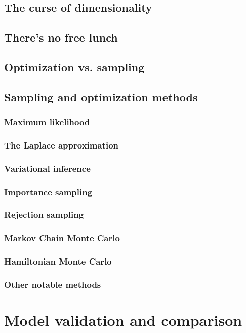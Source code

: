 \documentclass[]{report}
\begin{document}
\subsection{The curse of dimensionality}
\subsection{There's no free lunch}
\subsection{Optimization vs. sampling}

\subsection{Sampling and optimization methods}
\subsubsection{Maximum likelihood}
\subsubsection{The Laplace approximation}
\subsubsection{Variational inference}
\subsubsection{Importance sampling}
\subsubsection{Rejection sampling}
\subsubsection{Markov Chain Monte Carlo}
\subsubsection{Hamiltonian Monte Carlo}
\subsubsection{Other notable methods}

\section{Model validation and comparison}
\end{document}
